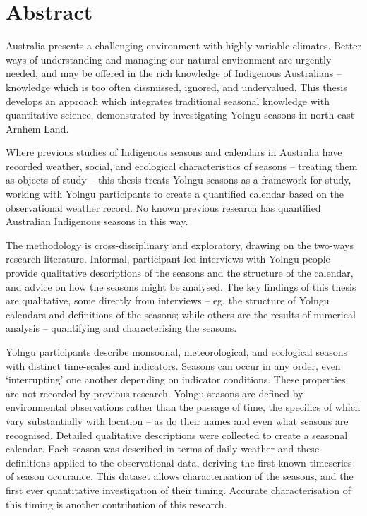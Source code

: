 \chapter{Abstract}

Australia presents a challenging environment with highly variable climates.
Better ways of understanding and managing our natural environment are urgently needed, and
may be offered in the rich knowledge of Indigenous Australians -- knowledge which
is too often dissmissed, ignored, and undervalued.
%
This thesis develops an approach which integrates traditional seasonal knowledge
with quantitative science, demonstrated by investigating Yolngu
seasons in north-east Arnhem Land.

Where previous studies of Indigenous seasons and calendars in Australia have
recorded weather, social, and ecological characteristics of seasons -- treating
them as objects of study -- this thesis treats Yolngu seasons as a framework
for study, working with Yolngu participants to create a quantified calendar
based on the observational weather record.  No known previous research has quantified
Australian Indigenous seasons in this way.


The methodology is cross-disciplinary and exploratory, drawing on the two-ways
research literature.  Informal, participant-led interviews with Yolngu people
provide qualitative descriptions of the seasons and the structure of the
calendar, and advice on how the seasons might be analysed.
%
The key findings of this thesis are qualitative, some directly from interviews
-- eg. the structure of Yolngu calendars and definitions of the seasons; while
others are the results of numerical analysis -- quantifying and characterising the seasons.


Yolngu participants describe monsoonal, meteorological, and ecological
seasons with distinct time-scales and indicators.  Seasons can occur in any
order, even `interrupting' one another depending on indicator conditions.
These properties are not recorded by previous research.
%
Yolngu seasons are defined by environmental observations rather than the
passage of time, the specifics of which vary substantially with location --
as do their names and even what seasons are recognised.  Detailed qualitative
descriptions were collected to create a seasonal calendar.
%
Each season was described in terms of daily weather and these definitions
applied to the observational data, deriving the first known timeseries of
season occurance.  This dataset allows characterisation of the seasons,
and the first ever quantitative investigation of their timing.  Accurate
characterisation of this timing is another contribution of this research.

